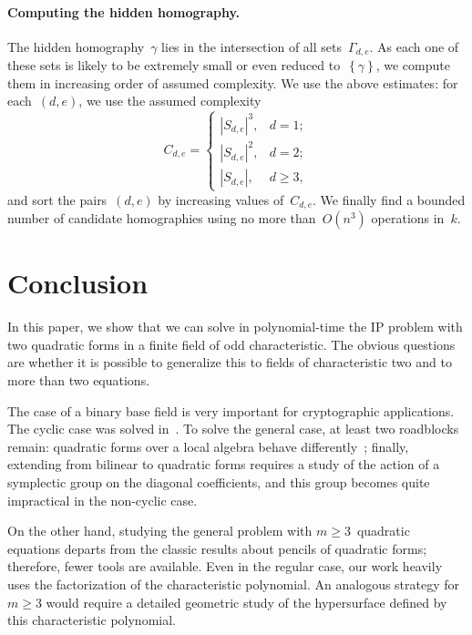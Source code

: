 \documentclass{article}%
\def\acco#1{\left\{#1\right\}}
\def\abs#1{\left|#1\right|}
\def\card#1{\abs{#1}}
\begin{document}
\paragraph{Computing the hidden homography.}

The hidden homography~$γ$ lies in the intersection of all sets~$Γ_{d,e}$.
As each one of these sets is likely to be extremely small or even reduced
to~$\acco{γ}$, we compute them in increasing order of assumed complexity.
We use the above estimates: for each~$(d,e)$, we use the assumed complexity
\begin{equation}
C_{d,e} = \begin{cases}
\card{S_{d,e}}^3,& d = 1;\\
\card{S_{d,e}}^2,& d = 2;\\
\card{S_{d,e}},& d≥ 3,
\end{cases}
\end{equation}
and sort the pairs~$(d,e)$ by increasing values of~$C_{d,e}$. We finally
find a bounded number of candidate homographies using no more
than~$O(n^3)$ operations in~$k$.

\section*{Conclusion}

In this paper, we show that we can solve in polynomial-time the IP
problem with two quadratic forms in a finite field of odd characteristic.
The obvious questions are whether it is possible to generalize this to
fields of characteristic two and to more than two equations.

The case of a binary base field is very important for cryptographic
applications. The cyclic case was solved in~\cite{MPG2013}. To solve
the general case, at least two roadblocks remain:
quadratic
forms over a local algebra behave differently~\cite[§93]{omeara};
finally, extending from bilinear to quadratic forms requires a study of
the action of a symplectic group on the diagonal coefficients, and this
group becomes quite impractical in the non-cyclic case.

On the other hand, studying the general problem with $m ≥ 3$~quadratic
equations departs from the classic results about pencils of quadratic
forms; therefore, fewer tools are available. Even in the regular
case, our work heavily uses the factorization of the characteristic
polynomial. An analogous strategy for~$m ≥ 3$ would require a detailed
geometric study of the hypersurface defined by this characteristic
polynomial.
\end{document}
